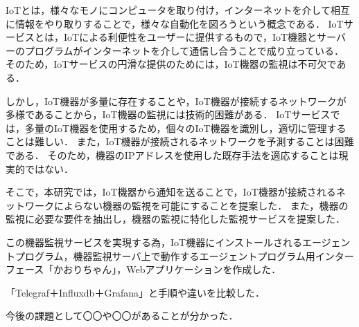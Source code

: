 IoTとは，様々なモノにコンピュータを取り付け，インターネットを介して相互に情報をやり取りすることで，様々な自動化を図ろうという概念である．
IoTサービスとは，IoTによる利便性をユーザーに提供するもので，IoT機器とサーバーのプログラムがインターネットを介して通信し合うことで成り立っている．
そのため，IoTサービスの円滑な提供のためには，IoT機器の監視は不可欠である．
\medskip

しかし，IoT機器が多量に存在することや，IoT機器が接続するネットワークが多様であることから，IoT機器の監視には技術的困難がある．
IoTサービスでは，多量のIoT機器を使用するため，個々のIoT機器を識別し，適切に管理することは難しい．
また，IoT機器が接続されるネットワークを予測することは困難である．
そのため，機器のIPアドレスを使用した既存手法を適応することは現実的ではない．
\medskip

そこで，本研究では，IoT機器から通知を送ることで，IoT機器が接続されるネットワークによらない機器の監視を可能にすることを提案した．
また，機器の監視に必要な要件を抽出し，機器の監視に特化した監視サービスを提案した．
\medskip

この機器監視サービスを実現する為，IoT機器にインストールされるエージェントプログラム，機器監視サーバ上で動作するエージェントプログラム用インターフェース「かおりちゃん」，Webアプリケーションを作成した．
\medskip

「Telegraf＋Influxdb＋Grafana」と手順や違いを比較した．


今後の課題として〇〇や〇〇があることが分かった．





